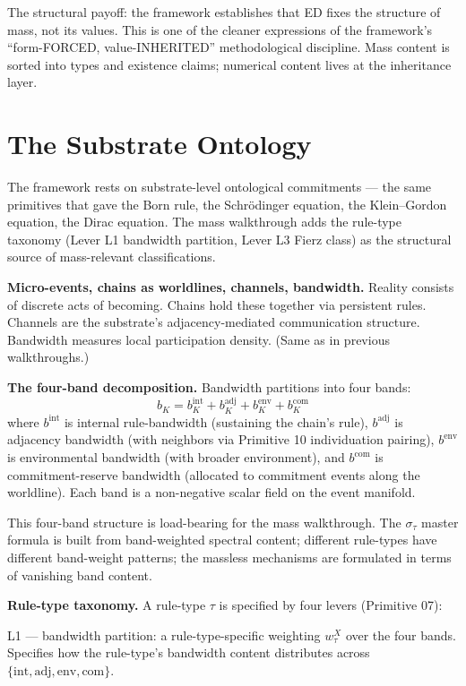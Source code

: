 \documentclass[11pt,a4paper]{article}
\begin{document}
The structural payoff: the framework establishes that ED fixes the structure of mass, not its values. This is one of the cleaner expressions of the framework's ``form-FORCED, value-INHERITED'' methodological discipline. Mass content is sorted into types and existence claims; numerical content lives at the inheritance layer.

\section{The Substrate Ontology}

The framework rests on substrate-level ontological commitments --- the same primitives that gave the Born rule, the Schr\"odinger equation, the Klein--Gordon equation, the Dirac equation. The mass walkthrough adds the rule-type taxonomy (Lever L1 bandwidth partition, Lever L3 Fierz class) as the structural source of mass-relevant classifications.

\textbf{Micro-events, chains as worldlines, channels, bandwidth.} Reality consists of discrete acts of becoming. Chains hold these together via persistent rules. Channels are the substrate's adjacency-mediated communication structure. Bandwidth measures local participation density. (Same as in previous walkthroughs.)

\textbf{The four-band decomposition.} Bandwidth partitions into four bands:
\[
b_K = b_K^{\mathrm{int}} + b_K^{\mathrm{adj}} + b_K^{\mathrm{env}} + b_K^{\mathrm{com}}
\]
where $b^{\mathrm{int}}$ is internal rule-bandwidth (sustaining the chain's rule), $b^{\mathrm{adj}}$ is adjacency bandwidth (with neighbors via Primitive 10 individuation pairing), $b^{\mathrm{env}}$ is environmental bandwidth (with broader environment), and $b^{\mathrm{com}}$ is commitment-reserve bandwidth (allocated to commitment events along the worldline). Each band is a non-negative scalar field on the event manifold.

This four-band structure is load-bearing for the mass walkthrough. The $\sigma_\tau$ master formula is built from band-weighted spectral content; different rule-types have different band-weight patterns; the massless mechanisms are formulated in terms of vanishing band content.

\textbf{Rule-type taxonomy.} A rule-type $\tau$ is specified by four levers (Primitive 07):

L1 --- bandwidth partition: a rule-type-specific weighting $w_\tau^X$ over the four bands. Specifies how the rule-type's bandwidth content distributes across $\{\mathrm{int}, \mathrm{adj}, \mathrm{env}, \mathrm{com}\}$.
\end{document}
